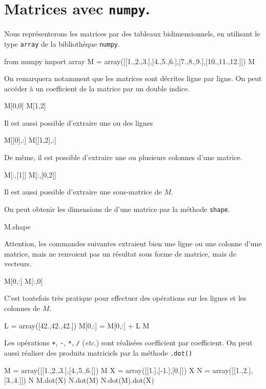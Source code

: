 \section{Matrices avec \texttt{numpy}.}

Nous représenterons les matrices par des tableaux bidimensionnels, en utilisant le type \texttt{array} de la bibliothèque \texttt{numpy}. 

\begin{pyconsole}
from numpy import array
M = array([[1.,2.,3.],[4.,5.,6.],[7.,8.,9.],[10.,11.,12.]])
M
\end{pyconsole}
On remarquera notamment que les matrices sont décrites ligne par ligne. 
On peut accéder à un coefficient de la matrice par un double indice. 
\begin{pyconsole}
M[0,0]
M[1,2]
\end{pyconsole}
Il est aussi possible d'extraire une ou des lignes
\begin{pyconsole}
M[[0],:]
M[[1,2],:]
\end{pyconsole}
De même, il est possible d'extraire une ou plusieurs colonnes d'une matrice. 
\begin{pyconsole}
M[:,[1]]
M[:,[0,2]]
\end{pyconsole}
\begin{rem}
Il est aussi possible d'extraire une sous-matrice de $M$. 
\end{rem}
On peut obtenir les dimensions de d'une matrice par la méthode \texttt{shape}.
\begin{pyconsole}
M.shape
\end{pyconsole}
\begin{rem}
Attention, les commandes suivantes extraient bien une ligne ou une colonne d'une matrice, mais ne renvoient pas un résultat sous forme de matrice, mais de vecteurs. 
\begin{pyconsole}
M[0,:]
M[:,0]
\end{pyconsole}
C'est toutefois très pratique pour effectuer des opérations sur les lignes et les colonnes de $M$.
\begin{pyconsole}
L = array([42.,42.,42.])
M[0,:] = M[0,:] + L
M
\end{pyconsole}
\end{rem}
Les opérations \texttt{+}, \texttt{-}, \texttt{*}, \texttt{/} (\emph{etc.}) sont réalisées coefficient par coefficient. 
On peut aussi réaliser des produits matriciels par la méthode \texttt{.dot()}
\begin{pyconsole}
M = array([[1.,2.,3.],[4.,5.,6.]])
M
X = array([[1.],[-1.],[0.]])
X
N = array([[1.,2.],[3.,4.]])
N
M.dot(X)
N.dot(M)
N.dot(M).dot(X)
\end{pyconsole}



